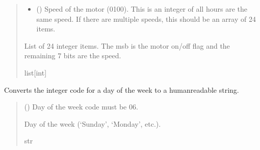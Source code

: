 \documentclass[letterpaper,10pt,english]{sphinxmanual}
\begin{document}
\begin{fulllineitems}
\begin{fulllineitems}
\begin{quote}
\begin{description}
\begin{itemize}
\item {} 
\sphinxAtStartPar
{} (\sphinxstyleliteralemphasis{\sphinxupquote{ | }}\sphinxstyleliteralemphasis{\sphinxupquote{ | }}\sphinxstyleliteralemphasis{\sphinxupquote{{[}}}\sphinxstyleliteralemphasis{\sphinxupquote{{]}}}) \textendash{} Speed of the motor (0\sphinxhyphen{}100). This is an integer of all hours                 are the same speed. If there are multiple speeds, this should be an array of 24 items.

\end{itemize}

\sphinxAtStartPar
List of 24 integer items. The msb is the motor on/off flag and the remaining 7 bits                 are the speed.

\sphinxAtStartPar
list{[}int{]}

\end{description}\end{quote}

\end{fulllineitems}


\begin{fulllineitems}
\label{\detokenize{PodDevice_8229:PodDevice_8229.POD_8229.DecodeDayOfWeek}}
\pysigstartsignatures
{}
\pysigstopsignatures
\sphinxAtStartPar
Converts the integer code for a day of the week to a human\sphinxhyphen{}readable string.
\begin{quote}\begin{description}
\sphinxAtStartPar
{} () \textendash{} Day of the week code must be 0\sphinxhyphen{}6.

\sphinxAtStartPar
Day of the week (‘Sunday’, ‘Monday’, etc.).

\sphinxAtStartPar
str


\end{description}
\end{quote}
\end{fulllineitems}
\end{fulllineitems}
\end{document}
